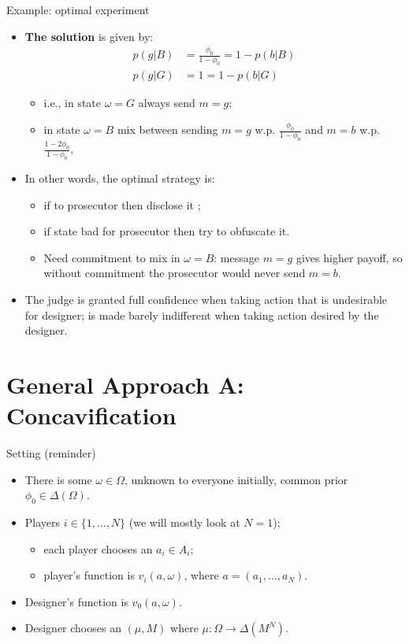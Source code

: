 \documentclass[english,10pt
,aspectratio=169
]{beamer}
\begin{document}
\begin{frame}{Example: optimal experiment}
\begin{itemize}
	\item \textbf{The solution} is given by:
	\vspace{-1em}\begin{align*}
		p(g|B) &= \frac{\phi_0}{1-\phi_0} = 1-p(b|B)
		\\
		p(g|G) &= 1 = 1-p(b|G)
	\end{align*}\vspace{-2em}
	\begin{itemize}
		\item i.e., in state $\omega=G$ always send $m=g$;
		\item in state $\omega=B$ mix between sending $m=g$ w.p. $\frac{\phi_0}{1-\phi_0}$ and $m=b$ w.p. $\frac{1-2\phi_0}{1-\phi_0}$,
	\end{itemize}
	\item In other words, the optimal strategy is:
	\begin{itemize}
		\item if  to prosecutor then disclose it ;
		\item if \alert{state bad} for prosecutor then try to \alert{obfuscate} it.
		\item Need \alert{commitment} to mix in $\omega=B$: message $m=g$ gives higher payoff, so without commitment the prosecutor would never send $m=b$.
	\end{itemize}
	\item The judge is granted full confidence when taking action that is undesirable for designer; is made barely indifferent when taking action desired by the designer.
\end{itemize}
\end{frame}



\section{General Approach A: Concavification}

\begin{frame}{Setting (reminder)}
\begin{itemize}
	\item There is some  $\omega \in \Omega$, unknown to everyone initially, common prior $\phi_0 \in \varDelta(\Omega)$.
	\item \alert{Players} $i \in \{1,...,N\}$ (we will mostly look at $N=1$);
	\begin{itemize}
		\item each player chooses an  $a_i \in A_i$;
		\item player's  function is $v_i(a, \omega)$, where $a = (a_1, ..., a_N)$.
	\end{itemize}
	\item \alert{Designer's}  function is $v_0(a, \omega)$.
	\item Designer chooses an  $(\mu,M)$ where $\mu: \Omega \to \varDelta(M^N)$.
\end{itemize}
\end{frame}
\end{document}
